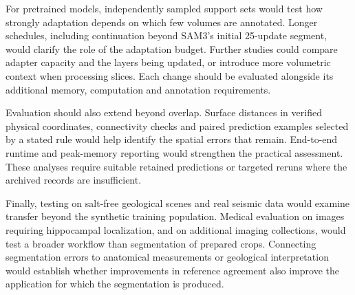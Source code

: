 \documentclass[12pt,a4paper]{article}
\begin{document}
For pretrained models, independently sampled support sets would test
how strongly adaptation depends on which few volumes are annotated.
Longer schedules, including continuation beyond SAM3's initial
25-update segment, would clarify the role of the adaptation budget.
Further studies could compare adapter capacity and the layers being
updated, or introduce more volumetric context when processing slices.
Each change should be evaluated alongside its additional memory,
computation and annotation requirements.

Evaluation should also extend beyond overlap. Surface distances in
verified physical coordinates, connectivity checks and paired prediction
examples selected by a stated rule would help identify the spatial
errors that remain. End-to-end runtime and peak-memory reporting would strengthen the
practical assessment. These analyses require suitable retained
predictions or targeted reruns where the archived records are
insufficient.

Finally, testing on salt-free geological scenes and real seismic data
would examine transfer beyond the synthetic training population.
Medical evaluation on images requiring hippocampal localization, and
on additional imaging collections, would test a broader workflow than
segmentation of prepared crops. Connecting segmentation errors to
anatomical measurements or geological interpretation would establish
whether improvements in reference agreement also improve the
application for which the segmentation is produced.

\clearpage
\end{document}
